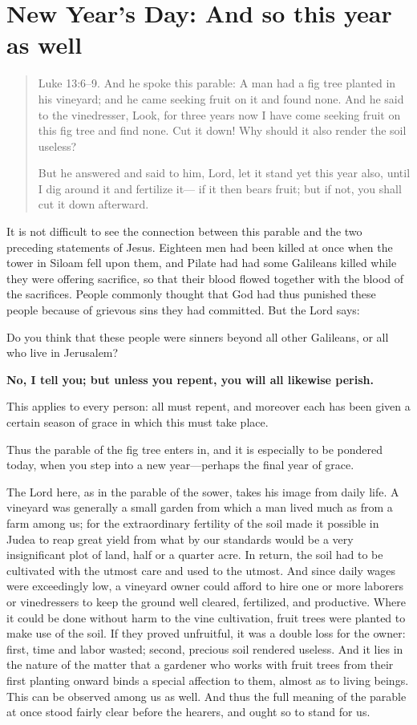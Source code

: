 \section{New Year’s Day: And so this year as well}


\begin{quote}
Luke 13:6–9. And he spoke this parable: A man had a fig tree planted in his vineyard; and he came seeking fruit on it and found none. And he said to the vinedresser, Look, for three years now I have come seeking fruit on this fig tree and find none. Cut it down! Why should it also render the soil useless?

But he answered and said to him, Lord, let it stand yet this year also, until I dig around it and fertilize it— if it then bears fruit; but if not, you shall cut it down afterward.
\end{quote}

\bigskip


It is not difficult to see the connection between this parable and the two preceding statements of Jesus. Eighteen men had been killed at once when the tower in Siloam fell upon them, and Pilate had had some Galileans killed while they were offering sacrifice, so that their blood flowed together with the blood of the sacrifices. People commonly thought that God had thus punished these people because of grievous sins they had committed. But the Lord says:

Do you think that these people were sinners beyond all other Galileans, or all who live in Jerusalem?

\textbf{No, I tell you; but unless you repent, you will all likewise perish.}

This applies to every person: all must repent, and moreover each has been given a certain season of grace in which this must take place.

Thus the parable of the fig tree enters in, and it is especially to be pondered today, when you step into a new year—perhaps the final year of grace.

The Lord here, as in the parable of the sower, takes his image from daily life. A vineyard was generally a small garden from which a man lived much as from a farm among us; for the extraordinary fertility of the soil made it possible in Judea to reap great yield from what by our standards would be a very insignificant plot of land, half or a quarter acre. In return, the soil had to be cultivated with the utmost care and used to the utmost. And since daily wages were exceedingly low, a vineyard owner could afford to hire one or more laborers or vinedressers to keep the ground well cleared, fertilized, and productive. Where it could be done without harm to the vine cultivation, fruit trees were planted to make use of the soil. If they proved unfruitful, it was a double loss for the owner: first, time and labor wasted; second, precious soil rendered useless. And it lies in the nature of the matter that a gardener who works with fruit trees from their first planting onward binds a special affection to them, almost as to living beings. This can be observed among us as well. And thus the full meaning of the parable at once stood fairly clear before the hearers, and ought so to stand for us.

